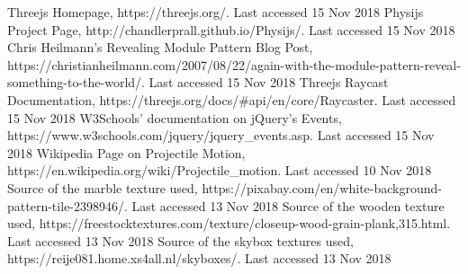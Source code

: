 \documentclass[runningheads]{llncs}
\begin{document}
	\newpage
	\begin{thebibliography}{8}
		Threejs Homepage, https://threejs.org/. Last accessed 15 Nov 2018
		Physijs Project Page, http://chandlerprall.github.io/Physijs/. Last accessed 15 Nov 2018
		Chris Heilmann's Revealing Module Pattern Blog Post, https://christianheilmann.com/2007/08/22/again-with-the-module-pattern-reveal-something-to-the-world/. Last accessed 15 Nov 2018
		Threejs Raycast Documentation, https://threejs.org/docs/\#api/en/core/Raycaster. Last accessed 15 Nov 2018
		W3Schools' documentation on jQuery's Events, https://www.w3schools.com/jquery/jquery\_events.asp. Last accessed 15 Nov 2018
		Wikipedia Page on Projectile Motion, https://en.wikipedia.org/wiki/Projectile\_motion. Last accessed 10 Nov 2018
		Source of the marble texture used, https://pixabay.com/en/white-background-pattern-tile-2398946/. Last accessed 13 Nov 2018
		Source of the wooden texture used, https://freestocktextures.com/texture/closeup-wood-grain-plank,315.html. Last accessed 13 Nov 2018
		Source of the skybox textures used, https://reije081.home.xs4all.nl/skyboxes/. Last accessed 13 Nov 2018
		
	\end{thebibliography}
\end{document}
